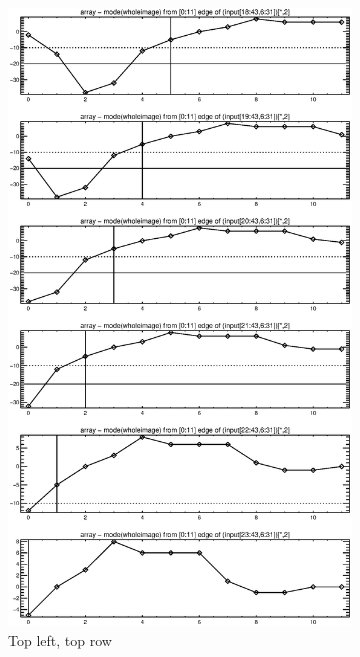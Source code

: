 \documentclass[10pt]{article}
\begin{document}
\begin{figure}[!h]
    \centering 
    \hspace{-1.0in}
    \begin{subfigure}[b]{.4\linewidth}
        \centering
        \includegraphics[width=1.4\textwidth]{plots_tables_images/topleft2.eps} 
        \caption{Top left, top row}
    \end{subfigure}
    \hspace{1.0in}
    \begin{subfigure}[b]{.4\linewidth}

\end{subfigure}
\end{figure}
\end{document}
